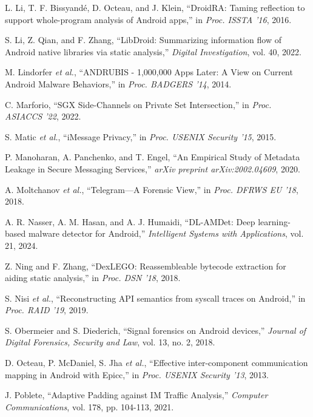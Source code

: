 \documentclass[a4paper,12pt]{report}
\begin{document}
\begin{thebibliography}{99}
L. Li, T. F. Bissyandé, D. Octeau, and J. Klein, “DroidRA: Taming reflection to support whole-program analysis of Android apps,” in \emph{Proc. ISSTA '16}, 2016.

S. Li, Z. Qian, and F. Zhang, “LibDroid: Summarizing information flow of Android native libraries via static analysis,” \emph{Digital Investigation}, vol. 40, 2022.

M. Lindorfer \emph{et al.}, “ANDRUBIS - 1,000,000 Apps Later: A View on Current Android Malware Behaviors,” in \emph{Proc. BADGERS '14}, 2014.

C. Marforio, “SGX Side-Channels on Private Set Intersection,” in \emph{Proc. ASIACCS '22}, 2022.

S. Matic \emph{et al.}, “iMessage Privacy,” in \emph{Proc. USENIX Security '15}, 2015.

P. Manoharan, A. Panchenko, and T. Engel, “An Empirical Study of Metadata Leakage in Secure Messaging Services,” \emph{arXiv preprint arXiv:2002.04609}, 2020.

A. Moltchanov \emph{et al.}, “Telegram—A Forensic View,” in \emph{Proc. DFRWS EU '18}, 2018.

A. R. Nasser, A. M. Hasan, and A. J. Humaidi, “DL-AMDet: Deep learning-based malware detector for Android,” \emph{Intelligent Systems with Applications}, vol. 21, 2024.

Z. Ning and F. Zhang, “DexLEGO: Reassembleable bytecode extraction for aiding static analysis,” in \emph{Proc. DSN '18}, 2018.

S. Nisi \emph{et al.}, “Reconstructing API semantics from syscall traces on Android,” in \emph{Proc. RAID '19}, 2019.

S. Obermeier and S. Diederich, “Signal forensics on Android devices,” \emph{Journal of Digital Forensics, Security and Law}, vol. 13, no. 2, 2018.

D. Octeau, P. McDaniel, S. Jha \emph{et al.}, “Effective inter-component communication mapping in Android with Epicc,” in \emph{Proc. USENIX Security '13}, 2013.

J. Poblete, “Adaptive Padding against IM Traffic Analysis,” \emph{Computer Communications}, vol. 178, pp. 104-113, 2021.


\end{thebibliography}
\end{document}
